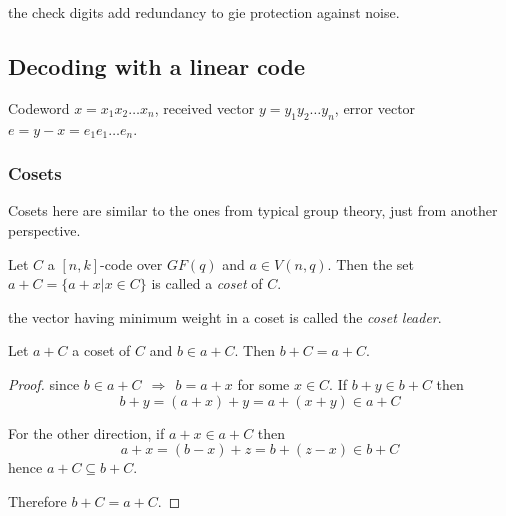 \documentclass{article}
\theoremstyle{definition}
\newenvironment{defn}[1]
{\renewcommand\theinnerdefn{#1}\innerdefn}
{\endinnerdefn}
\newenvironment{lemma}[1]
{\renewcommand\theinnerlemma{#1}\innerlemma}
{\endinnerlemma}
\newcommand{\Vnq}{V(n, q)}
\begin{document}
the check digits add redundancy to gie protection against noise.

\subsection{Decoding with a linear code}
Codeword $x=x_1 x_2 \ldots x_n$, received vector $y=y_1 y_2 \ldots y_n$, error vector $e = y-x=e_1 e_1 \ldots e_n$.

\subsubsection{Cosets}
Cosets here are similar to the ones from typical group theory, just from another perspective.

\begin{defn}{}[Coset]
  Let $C$ a $[n,k]$-code over $GF(q)$ and $a \in \Vnq$.
  Then the set $a + C = \{a+x | x\in C\}$ is called a \emph{coset} of $C$.
\end{defn}

\begin{defn}{}[Coset leader]
  the vector having minimum weight in a coset is called the \emph{coset leader}.
\end{defn}

\begin{lemma}{6.3} \label{h.6.3}
  Let $a+C$ a coset of $C$ and $b \in a+C$. Then $b+C=a+C$.
\end{lemma}
\begin{proof}
  since $b \in a+C ~~\Longrightarrow~~ b=a+x$ for some $x \in C$.
  If $b+y \in b+C$ then
  $$b+y=(a+x)+y = a+(x+y) \in a+C$$

  For the other direction, if $a+x \in a+C$ then
  $$a+x=(b-x)+z = b+(z-x) \in b+C$$
  hence $a+C \subseteq b+C$.

  Therefore $b+C = a+C$.
\end{proof}
\end{document}
